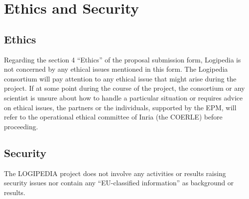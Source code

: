 \chapter{Ethics and Security}\label{chap:ethical}

\section{Ethics}

Regarding the section 4 ``Ethics'' of the proposal submission form,
Logipedia is not concerned by any ethical issues mentioned in this
form.  The Logipedia consortium will pay attention to any ethical
issue that might arise during the project. If at some point during
the course of the project, the consortium or any scientist is unsure
about how to handle a particular situation or requires advice on
ethical issues, the partners or the individuals, supported by the EPM,
will refer to the operational ethical committee of Inria (the COERLE)
before proceeding.

\section{Security}

The LOGIPEDIA project does not involve any activities or results
raising security issues nor contain any ``EU-classified information''
as background or results.

